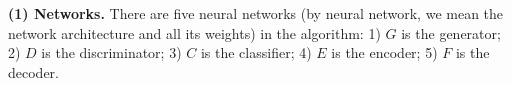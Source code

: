 \documentclass{article}
\newcommand\todo[1]{\textcolor{red}{#1}}
\begin{document}





{\bf (1) Networks.} There are five neural networks (by neural network, we mean the network architecture and all its weights) in the algorithm: 1) $G$ is the generator; 2) $D$ is the discriminator; 3) $C$ is the classifier; 4) $E$ is the encoder; 5) $F$ is the decoder. 
\end{document}
